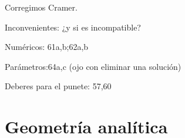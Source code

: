 Corregimos Cramer. 

Inconvenientes: ¿y si es incompatible?

Numéricos: 61a,b;62a,b

Parámetros:64a,c (ojo con eliminar una solución)



Deberes para el punete: 
57,60

\chapter{Geometría analítica}








